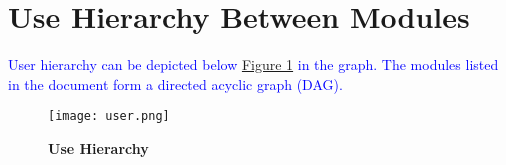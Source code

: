 \documentclass[12pt,letterpaper]{article}
\begin{document}
	\section{Use Hierarchy Between Modules} \label{SecUse}
\textcolor{blue}{User hierarchy can be depicted below \hyperref[FigUH]{Figure 1} in the graph. The modules listed in the document form a directed acyclic graph (DAG).} 
    \begin{figure}[H]
        \label{FigUH}
        \caption{\bf Use Hierarchy}
        \centering
        \bigskip
        \texttt{[image: user.png]}
    \end{figure}
\end{document}
